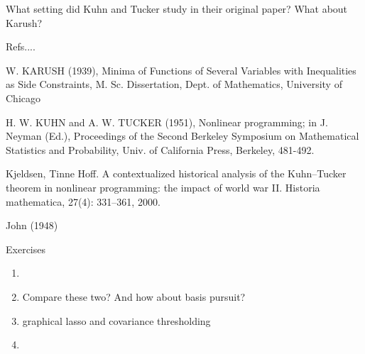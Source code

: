 What setting did Kuhn and Tucker study in their original paper? What about
Karush? 
 
Refs....

W. KARUSH (1939), Minima of Functions of Several Variables with Inequalities as
Side Constraints, M. Sc. Dissertation, Dept. of Mathematics, University of
Chicago 

H. W. KUHN and A. W. TUCKER (1951), Nonlinear programming; in
J. Neyman (Ed.), Proceedings of the Second Berkeley Symposium on Mathematical
Statistics and Probability, Univ. of California Press, Berkeley, 481-492. 

Kjeldsen, Tinne Hoff. A contextualized historical analysis of the Kuhn–Tucker
theorem in nonlinear programming: the impact of world war II. Historia
mathematica, 27(4): 331–361, 2000. 

 John (1948) 


\begin{xcb}{Exercises}
\begin{enumerate}[label=\thechapter.\arabic*]
\settowidth{\leftmargini}{00.00.\hskip\labelsep}
\item 

\item \label{ex:lasso_dantzig}
Compare these two? And how about basis pursuit?

\item graphical lasso and covariance thresholding

\item \label{ex:simplex_projection}

\end{enumerate}
\end{xcb}